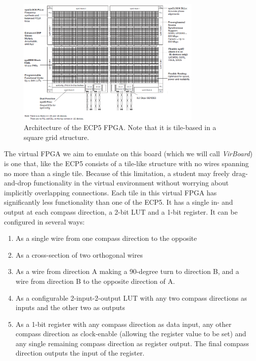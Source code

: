\begin{figure}
\centering
\includegraphics[width=0.8\textwidth]{images/ECP5Architecture.png}
\caption[Architecture of the ECP5 FPGA. Note that it is tile-based in a square grid structure]{Architecture of the ECP5 FPGA. Note that it is tile-based in a square grid structure.\footnotemark}
\label{fig:ecp5architecture}
\end{figure}

The virtual FPGA we aim to emulate on this board (which we will call \textit{VirBoard}) is one that, like the ECP5 consists of a tile-like structure with no wires spanning no more than a single tile. Because of this limitation, a student may freely drag-and-drop functionality in the virtual environment without worrying about implicitly overlapping connections. Each tile in this virtual FPGA has significantly less functionality than one of the ECP5. It has a single in- and output at each compass direction, a 2-bit LUT and a 1-bit register. It can be configured in several ways:

\begin{enumerate}
\item As a single wire from one compass direction to the opposite
\item As a cross-section of two orthogonal wires
\item As a wire from direction A making a 90-degree turn to direction B, and a wire from direction B to the opposite direction of A.
\item As a configurable 2-input-2-output LUT with any two compass directions as inputs and the other two as outputs
\item As a 1-bit register with any compass direction as data input, any other compass direction as clock-enable (allowing the register value to be set) and any single remaining compass direction as register output. The final compass direction outputs the input of the register.
\end{enumerate}

